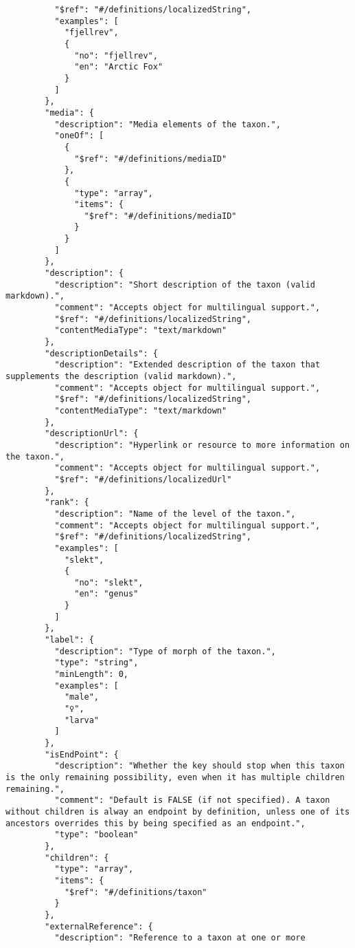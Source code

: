 \documentclass[10pt,letterpaper]{article}
\begin{document}
\begin{verbatim}
          "$ref": "#/definitions/localizedString",
          "examples": [
            "fjellrev",
            {
              "no": "fjellrev",
              "en": "Arctic Fox"
            }
          ]
        },
        "media": {
          "description": "Media elements of the taxon.",
          "oneOf": [
            {
              "$ref": "#/definitions/mediaID"
            },
            {
              "type": "array",
              "items": {
                "$ref": "#/definitions/mediaID"
              }
            }
          ]
        },
        "description": {
          "description": "Short description of the taxon (valid
markdown).",
          "comment": "Accepts object for multilingual support.",
          "$ref": "#/definitions/localizedString",
          "contentMediaType": "text/markdown"
        },
        "descriptionDetails": {
          "description": "Extended description of the taxon that
supplements the description (valid markdown).",
          "comment": "Accepts object for multilingual support.",
          "$ref": "#/definitions/localizedString",
          "contentMediaType": "text/markdown"
        },
        "descriptionUrl": {
          "description": "Hyperlink or resource to more information on
the taxon.",
          "comment": "Accepts object for multilingual support.",
          "$ref": "#/definitions/localizedUrl"
        },
        "rank": {
          "description": "Name of the level of the taxon.",
          "comment": "Accepts object for multilingual support.",
          "$ref": "#/definitions/localizedString",
          "examples": [
            "slekt",
            {
              "no": "slekt",
              "en": "genus"
            }
          ]
        },
        "label": {
          "description": "Type of morph of the taxon.",
          "type": "string",
          "minLength": 0,
          "examples": [
            "male",
            "♀",
            "larva"
          ]
        },
        "isEndPoint": {
          "description": "Whether the key should stop when this taxon
is the only remaining possibility, even when it has multiple children
remaining.",
          "comment": "Default is FALSE (if not specified). A taxon
without children is alway an endpoint by definition, unless one of its
ancestors overrides this by being specified as an endpoint.",
          "type": "boolean"
        },
        "children": {
          "type": "array",
          "items": {
            "$ref": "#/definitions/taxon"
          }
        },
        "externalReference": {
          "description": "Reference to a taxon at one or more

\end{verbatim}
\end{document}
